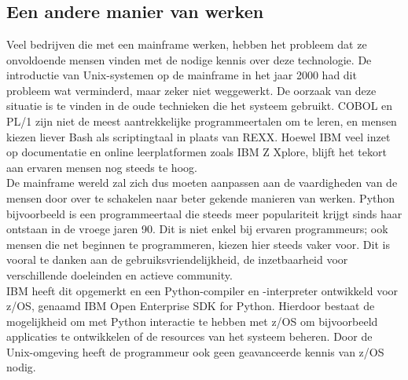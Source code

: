 \chapter{}%
\label{ch:stand-van-zaken}



\section{Een andere manier van werken}
\label{sec:andere-manier-van-werken}
Veel bedrijven die met een mainframe werken, hebben het probleem dat ze onvoldoende mensen vinden met de nodige kennis over deze technologie. De introductie van Unix-systemen op de mainframe in het jaar 2000 \autocite{Mertic2020} had dit probleem wat verminderd, maar zeker niet weggewerkt. De oorzaak van deze situatie is te vinden in de oude technieken die het systeem gebruikt. COBOL en PL/1 zijn niet de meest aantrekkelijke programmeertalen om te leren, en mensen kiezen liever Bash als scriptingtaal in plaats van REXX. Hoewel IBM veel inzet op documentatie en online leerplatformen zoals IBM Z Xplore, blijft het tekort aan ervaren mensen nog steeds te hoog. \\

De mainframe wereld zal zich dus moeten aanpassen aan de vaardigheden van de mensen door over te schakelen naar beter gekende manieren van werken. 
Python bijvoorbeeld is een programmeertaal die steeds meer populariteit krijgt sinds haar ontstaan in de vroege jaren 90. Dit is niet enkel bij ervaren programmeurs; ook mensen die net beginnen te programmeren, kiezen hier steeds vaker voor. Dit is vooral te danken aan de gebruiksvriendelijkheid, de inzetbaarheid voor verschillende doeleinden en actieve community. \autocite{Johnson2023} \\

IBM heeft dit opgemerkt en een Python-compiler en -interpreter ontwikkeld voor z/OS, genaamd IBM Open Enterprise SDK for Python. Hierdoor bestaat de mogelijkheid om met Python interactie te hebben met z/OS om bijvoorbeeld applicaties te ontwikkelen of de resources van het systeem beheren. Door de Unix-omgeving heeft de programmeur ook geen geavanceerde kennis van z/OS nodig. \autocite{Klaey2023}

